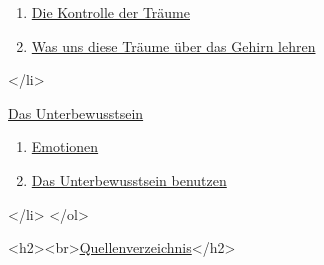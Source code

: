 {\begin{enumerate}[label={\alph*.}]
   \item \hyperref[c3_5f]{Die Kontrolle der Träume}
   \item \hyperref[c3_5g]{Was uns diese Träume über das Gehirn lehren}
   \end{enumerate}
</li>
 \item \hyperref[c3_6]{Das Unterbewusstsein}
  \begin{enumerate}[label={\alph*.}] 
   <li>\hyperref[c3_6a]{Einleitung}
   \item \hyperref[c3_6b]{Emotionen}
   \item \hyperref[c3_6c]{Das Unterbewusstsein benutzen}
   \end{enumerate}
</li>
</ol>

<h2><br>\hyperref[reference]{Quellenverzeichnis}</h2>

}
